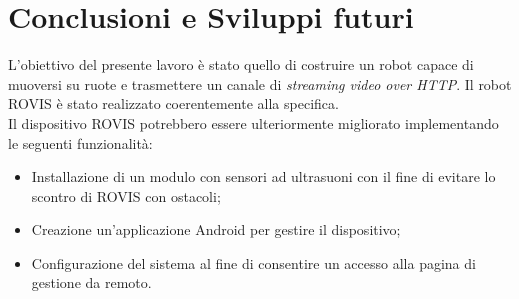 \documentclass[11pt]{article}
\begin{document}
\section{Conclusioni e Sviluppi futuri}
L'obiettivo del presente lavoro è stato quello di costruire un robot capace di muoversi su ruote e trasmettere un canale di \textit{streaming video over HTTP}. Il robot ROVIS è stato realizzato coerentemente alla specifica.\\
Il dispositivo ROVIS potrebbero essere ulteriormente migliorato implementando le seguenti funzionalità:
\begin{itemize}
	\item Installazione di un modulo con sensori ad ultrasuoni con il fine di evitare lo scontro di ROVIS con ostacoli;
	\item Creazione un'applicazione Android per gestire il dispositivo;
	\item Configurazione del sistema al fine di consentire un accesso alla pagina di gestione da remoto.
\end{itemize}
	
%
%
\end{document}
